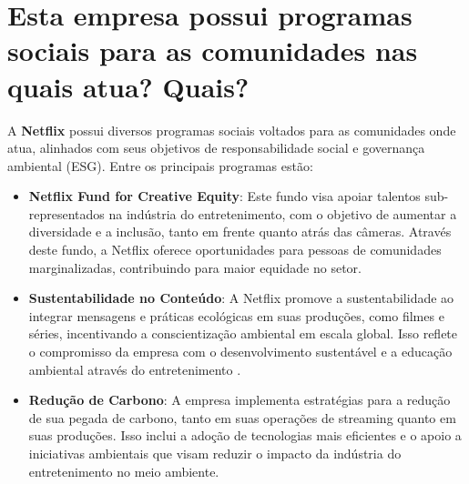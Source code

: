 \section{Esta empresa possui programas sociais para as comunidades nas quais atua? Quais?}

A \textbf{Netflix} possui diversos programas sociais voltados para as comunidades onde atua, alinhados com seus objetivos de responsabilidade social e governança ambiental (ESG). Entre os principais programas estão:

\begin{itemize}
    \item \textbf{Netflix Fund for Creative Equity}: Este fundo visa apoiar talentos sub-representados na indústria do entretenimento, com o objetivo de aumentar a diversidade e a inclusão, tanto em frente quanto atrás das câmeras. Através deste fundo, a Netflix oferece oportunidades para pessoas de comunidades marginalizadas, contribuindo para maior equidade no setor.

    \item \textbf{Sustentabilidade no Conteúdo}: A Netflix promove a sustentabilidade ao integrar mensagens e práticas ecológicas em suas produções, como filmes e séries, incentivando a conscientização ambiental em escala global. Isso reflete o compromisso da empresa com o desenvolvimento sustentável e a educação ambiental através do entretenimento \cite{netflix_esg}.

    \item \textbf{Redução de Carbono}: A empresa implementa estratégias para a redução de sua pegada de carbono, tanto em suas operações de streaming quanto em suas produções. Isso inclui a adoção de tecnologias mais eficientes e o apoio a iniciativas ambientais que visam reduzir o impacto da indústria do entretenimento no meio ambiente.

\end{itemize}
